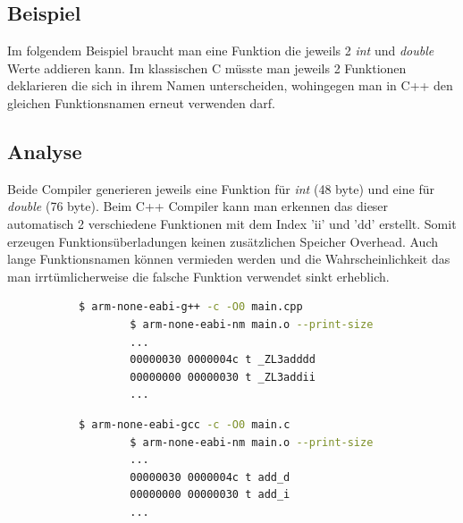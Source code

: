 \documentclass[MES,Master,ngerman]{twbook}%
\begin{document}
\subsection{Beispiel} \label{beispiel:1}
Im folgendem Beispiel braucht man eine Funktion die jeweils 2 \textit{int} und \textit{double} Werte addieren kann. Im klassischen C müsste man jeweils 2 Funktionen deklarieren die sich in ihrem Namen unterscheiden, wohingegen man in C++ den gleichen Funktionsnamen erneut verwenden darf.
\begin{figure}[!htb]
	\begin{subfigure}[b]{0.5\textwidth}
		
		\label{fig:1}
	\end{subfigure}
	\begin{subfigure}[b]{0.5\textwidth}
		
		\label{fig:2}
	\end{subfigure}
\end{figure}

\subsection{Analyse}
Beide Compiler generieren jeweils eine Funktion für \textit{int} (48 byte) und eine für \textit{double} (76 byte). Beim C++ Compiler kann man erkennen das dieser automatisch 2 verschiedene Funktionen mit dem Index 'ii' und 'dd' erstellt. Somit erzeugen Funktionsüberladungen keinen zusätzlichen Speicher Overhead. Auch lange Funktionsnamen können vermieden werden und die Wahrscheinlichkeit das man irrtümlicherweise die falsche Funktion verwendet sinkt erheblich.
\begin{figure}[!htb]
	\begin{subfigure}[b]{0.5\textwidth}
		\begin{lstlisting}[gobble=6, title={Analyse C++}, language=bash, numbers=none]
		$ arm-none-eabi-g++ -c -O0 main.cpp
		$ arm-none-eabi-nm main.o --print-size
		...
		00000030 0000004c t _ZL3adddd
		00000000 00000030 t _ZL3addii
		...
		\end{lstlisting}
	\end{subfigure}
	\begin{subfigure}[b]{0.5\textwidth}
		\begin{lstlisting}[gobble=6, title={Analyse C}, language=bash, numbers=none]
		$ arm-none-eabi-gcc -c -O0 main.c
		$ arm-none-eabi-nm main.o --print-size
		...
		00000030 0000004c t add_d
		00000000 00000030 t add_i
		...
		\end{lstlisting}
	\end{subfigure}
\end{figure}
\end{document}
